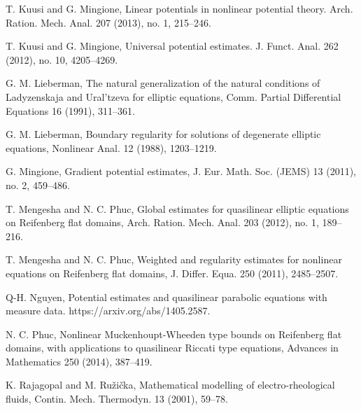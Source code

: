 \documentclass[a4paper,10pt]{amsart}
\begin{document}
\begin{thebibliography}{999}
	 
	 T. Kuusi and G. Mingione, Linear potentials in nonlinear potential theory. Arch. Ration. Mech. Anal. 207 (2013), no. 1, 215--246.
	
	 T. Kuusi and G. Mingione,  Universal potential estimates. J. Funct. Anal. 262 (2012), no. 10, 4205--4269.
	
	
	
	 G. M. Lieberman, The natural generalization of the natural conditions of Ladyzenskaja and Ural’tzeva for elliptic equations, Comm. Partial Differential Equations 16 (1991), 311--361.
	
	 G. M. Lieberman, Boundary regularity for solutions of degenerate elliptic equations, Nonlinear Anal. 12 	(1988), 1203--1219.
	
	 G. Mingione, Gradient potential estimates, J. Eur. Math. Soc. (JEMS) 13 (2011), no. 2, 459--486.
	
	 T. Mengesha and N. C. Phuc, Global estimates for quasilinear elliptic equations on Reifenberg flat domains, Arch. Ration. Mech. Anal. 203 (2012), no. 1, 189--216.
	
	 T. Mengesha and N. C. Phuc, Weighted and regularity estimates for nonlinear equations on Reifenberg flat domains, J. Differ. Equa. 250 (2011), 2485--2507.
	
	 Q-H. Nguyen, Potential estimates and quasilinear parabolic equations with measure data. https://arxiv.org/abs/1405.2587.
	
	
	 N. C. Phuc, Nonlinear Muckenhoupt-Wheeden type bounds on Reifenberg flat domains, with applications to quasilinear Riccati type equations, Advances in Mathematics 250 (2014), 387--419. 
	
	
	 K. Rajagopal and M. Ru\v{z}i\v{c}ka, Mathematical modelling of electro-rheological fluids, Contin. Mech. Thermodyn. 13 (2001), 59--78.
	

\end{thebibliography}
\end{document}
